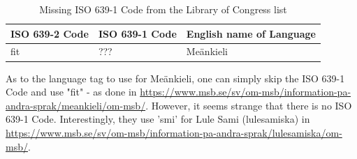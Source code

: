 \documentclass[12pt, twoside]{article}
\begin{document}
\FloatBarrier

\begin{table}[!ht]
    \caption{Missing \gls{ISO} 639-1 Code from the Library of Congress list}
    \label{tab:languagesMissing}
    \begin{tabular}{L{3cm}|L{3cm}|L{6.5cm}}
      \textbf{\gls{ISO} 639-2 Code} & \textbf{\gls{ISO} 639-1 Code} & \textbf{English name of Language}\\
      \hline
fit & ??? & Meänkieli\\
\hline
   \end{tabular}
\end{table}
\FloatBarrier

As to the language tag to use for Meänkieli, one can simply skip the \gls{ISO} 639-1 Code and use "fit" - as done in \url{https://www.msb.se/sv/om-msb/information-pa-andra-sprak/meankieli/om-msb/}.
However, it seems strange that there is no \gls{ISO} 639-1 Code. Interestingly, they use 'smi' for Lule Sami (\foreignlanguage{swedish}{lulesamiska}) in \url{https://www.msb.se/sv/om-msb/information-pa-andra-sprak/lulesamiska/om-msb/}.
\end{document}
